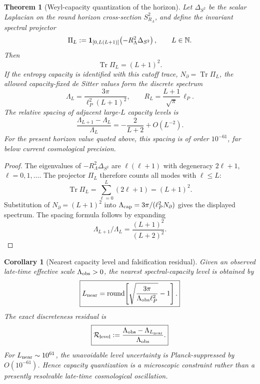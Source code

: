 \documentclass[aps,prd,reprint,nofootinbib,superscriptaddress,floatfix]{revtex4-2}
\numberwithin{equation}{section}
\theoremstyle{definition}
\theoremstyle{plain}
\newtheorem{theorem}{Theorem}[section]
\newtheorem{corollary}{Corollary}[section]
\newcommand{\Ncap}{N_{\partial}}
\begin{document}
\begin{theorem}[Weyl-capacity quantization of the horizon]
\label{thm:weyl-capacity-quantization}
Let \(\Delta_{S^2}\) be the scalar Laplacian on the round horizon cross-section
\(S^2_{R_\Lambda}\), and define the invariant spectral projector
\begin{equation}
\Pi_L:=
{\bf 1}_{[0,L(L+1)]}\!\left(-R_\Lambda^2\Delta_{S^2}\right),
\qquad L\in\mathbb N .
\end{equation}
Then
\begin{equation}
\boxed{
\operatorname{Tr}\Pi_L=(L+1)^2 .
}
\end{equation}
If the entropy capacity is identified with this cutoff trace,
\(\Ncap=\operatorname{Tr}\Pi_L\), the allowed capacity-fixed de Sitter
values form the discrete spectrum
\begin{equation}
\boxed{
\Lambda_L=
\frac{3\pi}{\ell_P^2(L+1)^2},
\qquad
R_L=\frac{L+1}{\sqrt{\pi}}\,\ell_P .
}
\end{equation}
The relative spacing of adjacent large-\(L\) capacity levels is
\begin{equation}
\boxed{
\frac{\Lambda_{L+1}-\Lambda_L}{\Lambda_L}
=
-\frac{2}{L+2}+O(L^{-2}).
}
\end{equation}
For the present horizon value quoted above, this spacing is of order
\(10^{-61}\), far below current cosmological precision.
\end{theorem}

\begin{proof}
The eigenvalues of \(-R_\Lambda^2\Delta_{S^2}\) are
\(\ell(\ell+1)\) with degeneracy \(2\ell+1\), \(\ell=0,1,\ldots\).
The projector \(\Pi_L\) therefore counts all modes with \(\ell\le L\):
\[
\operatorname{Tr}\Pi_L
=
\sum_{\ell=0}^{L}(2\ell+1)
=
(L+1)^2 .
\]
Substitution of \(\Ncap=(L+1)^2\) into
\(\Lambda_{\rm cap}=3\pi/(\ell_P^2\Ncap)\) gives the displayed spectrum.
The spacing formula follows by expanding
\[
\Lambda_{L+1}/\Lambda_L=\frac{(L+1)^2}{(L+2)^2}.
\]
\end{proof}

\begin{corollary}[Nearest capacity level and falsification residual]
\label{cor:nearest-capacity-level}
Given an observed late-time effective scale \(\Lambda_{\rm obs}>0\), the
nearest spectral-capacity level is obtained by
\begin{equation}
\boxed{
L_{\rm near}
=
\operatorname{round}\!\left[
\sqrt{\frac{3\pi}{\Lambda_{\rm obs}\ell_P^2}}-1
\right].
}
\end{equation}
The exact discreteness residual is
\begin{equation}
\boxed{
\mathcal R_{\rm level}
:=
\frac{\Lambda_{\rm obs}-\Lambda_{L_{\rm near}}}{\Lambda_{\rm obs}} .
}
\end{equation}
For \(L_{\rm near}\sim10^{61}\), the unavoidable level uncertainty is
Planck-suppressed by \(O(10^{-61})\).  Hence capacity quantization is a
microscopic constraint rather than a presently resolvable late-time
cosmological oscillation.
\end{corollary}
\end{document}
